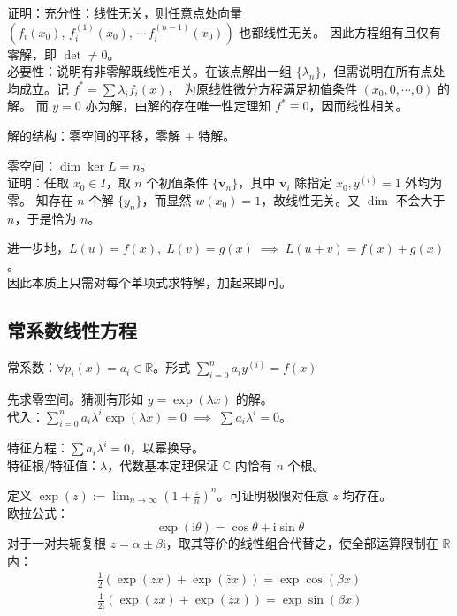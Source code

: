 \documentclass[12pt, a4paper, UTF8, openany]{ctexbook}
\newcommand{\field}[1]{\mathbb{#1}}%
\newcommand{\imunit}{\mathrm{i}}%
\newcommand{\mat}[1]{\mathbf{#1}}
\begin{document}
        证明：充分性：线性无关，则任意点处向量 $(f_i(x_0),\, f_i^{(1)}(x_0), \, \cdots \, f_i^{(n - 1)}(x_0))$ 也都线性无关。
        因此方程组有且仅有零解，即 $\det \neq 0$。\\
        必要性：说明有非零解既线性相关。在该点解出一组 $\{\lambda_n\}$，但需说明在所有点处均成立。记 $f^\ast = \sum\lambda_i f_i(x)$，
        为原线性微分方程满足初值条件 $(x_0, 0, \cdots, 0)$ 的解。
        而 $y = 0$ 亦为解，由解的存在唯一性定理知 $f^\ast \equiv 0$，因而线性相关。

        解的结构：零空间的平移，零解 + 特解。

        零空间：$\dim \ker L = n$。\\
        证明：任取 $x_0 \in I$，取 $n$ 个初值条件 $\{\mat{v}_n\}$，其中 $\mat{v}_i$ 除指定 $x_0, y^{(i)} = 1$ 外均为零。
        知存在 $n$ 个解 $\{y_n\}$，而显然 $w(x_0) = 1$，故线性无关。又 $\dim$ 不会大于 $n$，于是恰为 $n$。

        进一步地，$L(u) = f(x), \; L(v) = g(x) \; \implies \; L(u + v) = f(x) + g(x)$。\\
        因此本质上只需对每个单项式求特解，加起来即可。

        \newpage

        \subsection{常系数线性方程}
        常系数：$\forall p_i(x) = a_i \in \field{R}$。形式 $\sum\limits_{i = 0}^{n} a_i y^{(i)} = f(x)$

        先求零空间。猜测有形如 $y = \exp(\lambda x)$ 的解。\\
        代入：$\sum\limits_{i = 0}^{n} a_i \lambda^i \exp(\lambda x) = 0 \;\implies\; \sum a_i \lambda^i = 0$。

        特征方程：$\sum a_i \lambda^i = 0$，以幂换导。\\
        特征根/特征值：$\lambda$，代数基本定理保证 $\field{C}$ 内恰有 $n$ 个根。

        定义 $\exp(z) := \lim_{n \to \infty} (1 + \frac{z}{n})^n$。可证明极限对任意 $z$ 均存在。\\
        欧拉公式：$$\exp(\imunit \theta) = \cos\theta + \imunit\sin\theta$$
        对于一对共轭复根 $z = \alpha \pm \beta\imunit$，取其等价的线性组合代替之，使全部运算限制在 $\field{R}$ 内：
        $$\begin{aligned}
            \frac{1}{2}(\exp(zx) + \exp(\bar{z}x)) = \exp\cos(\beta x) \\
            \frac{1}{2\imunit}(\exp(zx) + \exp(\bar{z}x)) = \exp\sin(\beta x)
        \end{aligned}$$
\end{document}
